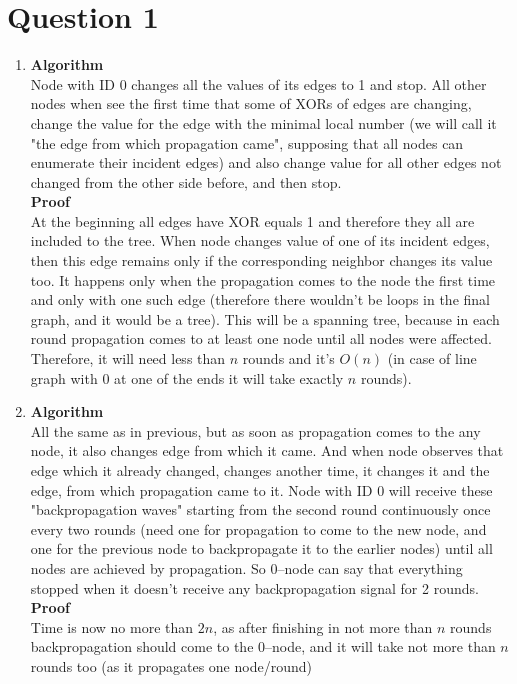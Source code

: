 \documentclass[]{article}
\title{}
\author{}
\begin{document}

\section*{Question 1}
\begin{enumerate}
	\item \textbf{Algorithm}\\
	Node with ID 0 changes all the values of its edges to 1 and stop. All other nodes when see the first time that some of XORs of edges are changing, change the value for the edge with the minimal local number (we will call it "the edge from which propagation came", supposing that all nodes can enumerate their incident edges) and also change value for all other edges not changed from the other side before, and then stop.\\ 
	\textbf{Proof}\\ 
	At the beginning all edges have XOR equals 1 and therefore they all are included to the tree. When node changes value of one of its incident edges, then this edge remains only if the corresponding neighbor changes its value too. It happens only when the propagation comes to the node the first time and only with one such edge (therefore there wouldn't be loops in the final graph, and it would be a tree). This will be a spanning tree, because in each round propagation comes to at least one node until all nodes were affected. Therefore, it will need less than $n$ rounds and it's $O(n)$ (in case of line graph with 0 at one of the ends it will take exactly $n$ rounds).
	
	\item \textbf{Algorithm}\\
	All the same as in previous, but as soon as propagation comes to the any node, it also changes edge from which it came. And when node observes that edge which it already changed, changes another time, it changes it and the edge, from which propagation came to it. Node with ID 0 will receive these "backpropagation waves" starting from the second round continuously once every two rounds (need one for propagation to come to the new node, and one for the previous node to backpropagate it to the earlier nodes) until all nodes are achieved by propagation. So 0--node can say that everything stopped when it doesn't receive any backpropagation signal for 2 rounds.\\ 
	\textbf{Proof}\\ 
	Time is now no more than $2n$, as after finishing in not more than $n$ rounds backpropagation should come to the 0--node, and it will take not more than $n$ rounds too (as it propagates one node/round)
	

\end{enumerate}
\end{document}
